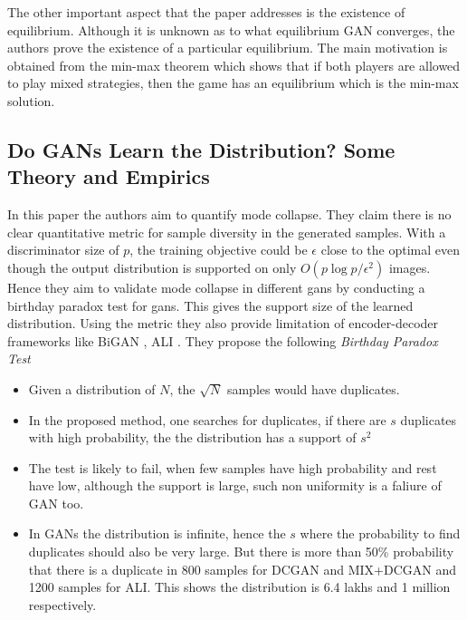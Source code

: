 The other important aspect that the paper addresses is the existence of equilibrium. Although it is unknown as to what equilibrium GAN converges, the authors prove the existence of a particular equilibrium. The main motivation is obtained from the min-max theorem \citep{neumann1928} which shows that if both players are allowed to play mixed strategies, then the game has an equilibrium which is the min-max solution. 


\subsection*{Do GANs Learn the Distribution? Some Theory and Empirics \citep{doarora}}
In this paper the authors aim to quantify mode collapse. They claim there is no clear quantitative metric for sample diversity in the generated samples. With a discriminator size of $p$, the training objective could be $\epsilon$ close to the optimal even though the output distribution is supported on only $O\left(p \log p / \epsilon^{2}\right)$ images. \\
Hence they aim to validate mode collapse in different gans by conducting a birthday paradox test for gans. This gives the support size of the learned distribution. Using the metric they also provide limitation of encoder-decoder frameworks like BiGAN \citep{bigan}, ALI \citep{ali}. They propose the following \emph{Birthday Paradox Test}
 
\begin{itemize}
    \item Given a distribution of $N$, the $\sqrt{N}$ samples would have duplicates.
    \item In the proposed method, one searches for duplicates, if there are $s$ duplicates with high probability, the the distribution has a support of $s^2$
    \item The test is likely to fail, when few samples have high probability and rest have low, although the support is large, such non uniformity is a faliure of GAN too.
    \item In GANs the distribution is infinite, hence the $s$ where the probability to find duplicates should also be very large. But there is more than 50\% probability that there is a duplicate in 800 samples for DCGAN and MIX+DCGAN and 1200 samples for ALI. This shows the distribution is 6.4 lakhs and 1 million respectively.
\end{itemize}{}


